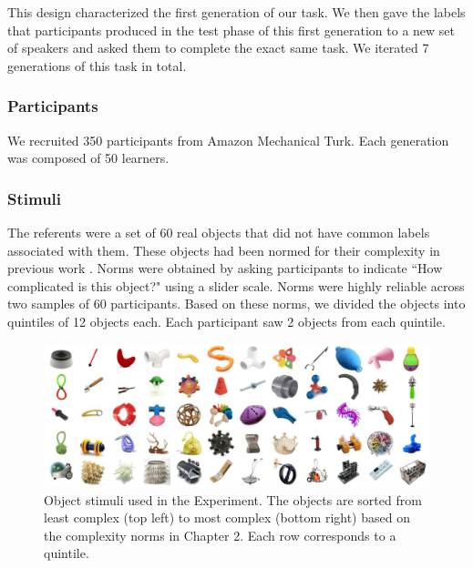 This design characterized the first generation of our task. We then gave the labels that participants produced in the test phase of this first generation to a new set of speakers and asked them to complete the exact same task. We iterated 7 generations of this task in total.


\subsubsection{Participants} 

We recruited 350 participants from Amazon Mechanical Turk. Each generation was composed of 50 learners.

\subsubsection{Stimuli}

The referents were a set of 60 real objects that did not have common labels associated with them. These objects had been normed for their complexity in previous work \cite[Figure\ 1]{lewisstructure2014}. Norms were obtained by asking participants to indicate ``How complicated is this object?" using a slider scale. Norms were highly reliable across two samples of 60 participants. Based on these norms, we divided the objects into quintiles of 12 objects each. Each participant saw 2 objects from each quintile. 

\begin{figure}[b!]
\begin{center}
\includegraphics[width = 1\linewidth]{figs/realobjs.pdf}
\end{center}
\vspace{-.24em}
\caption{Object stimuli used in the Experiment. The objects are sorted from least complex (top left) to most complex (bottom right) based on the complexity norms in Chapter 2. Each row corresponds to a quintile.}
\label{fig:objs}
\vspace{-1em}
\end{figure}


